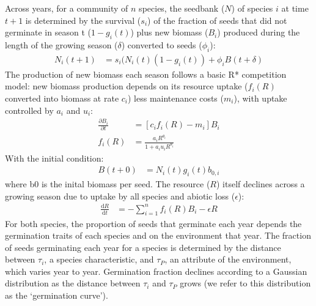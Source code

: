 \documentclass[11pt,letterpaper]{article}
\begin{document}
Across years, for a community of \(n\) species, the seedbank ($N$) of species $i$ at time $t+1$ is determined by the survival ($s_i$) of the fraction of seeds that did not germinate in season t ($1-g_{i}(t)$) plus new biomass ($B_i$) produced during the length of the  growing season ($\delta$) converted to seeds ($\phi_i$):
\begin{align}
N_{i}(t+1) & =
s_{i}(N_{i}(t)(1-g_{i}(t))+\phi_{i}B(t+\delta)
\end{align}
The production of new biomass each season follows a basic R* competition model: new biomass production depends on its resource uptake ($f_i(R)$ converted into biomass at rate $c_i$) less maintenance costs ($m_i$), with uptake controlled by $a_i$ and $u_i$:
\begin{align}
\frac{\partial B_{i}}{\partial t} &  = [c_{i}f_{i}(R) - m_{i}]B_{i} \\
f_{i}(R) & = \frac{a_{i}R^{\theta_{i}}}{1+a_{i}u_{i}R^{\theta_{i}}}
\end{align}
With the initial condition:
\begin{align}
B(t+0) & = N_{i}(t)g_{i}(t)b_{0,i}
\end{align}
where b0 is the inital biomass per seed.
The resource ($R$) itself declines across a growing season due to uptake by all species and abiotic loss ($\epsilon$):
\begin{align}
\frac{\mathrm{d}R}{\mathrm{d}t} & = - \sum_{i=1}^{n}f_{i}(R)B_{i} -\epsilon R
\end{align}
For both species, the proportion of seeds that germinate each year depends the germination traits of each species and on the environment that year. The fraction of seeds germinating each year for a species is determined by the distance between $\tau_i$, a species characteristic, and $\tau_P$, an attribute of the environment, which varies year to year. Germination fraction declines according to a Gaussian distribution as the distance between $\tau_i$ and $\tau_P$ grows (we refer to this distribution as the `germination curve').
\end{document}
